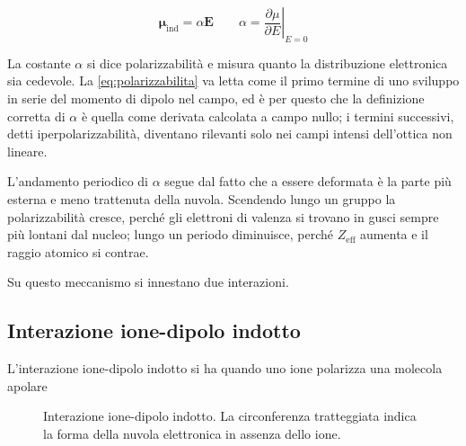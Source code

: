 \begin{equation}
    \boldsymbol{\mu}_{\text{ind}} = \alpha\mathbf{E} \qquad \alpha = \left.\frac{\partial\mu}{\partial E}\right|_{E=0}
    \label{eq:polarizzabilita}
\end{equation}

La costante $\alpha$ si dice polarizzabilità e misura quanto la distribuzione elettronica sia cedevole.
La \eqref{eq:polarizzabilita} va letta come il primo termine di uno sviluppo in serie del momento di dipolo nel campo, ed è per questo che la definizione corretta di $\alpha$ è quella come derivata calcolata a campo nullo; i termini successivi, detti iperpolarizzabilità, diventano rilevanti solo nei campi intensi dell'ottica non lineare.

L'andamento periodico di $\alpha$ segue dal fatto che a essere deformata è la parte più esterna e meno trattenuta della nuvola.
Scendendo lungo un gruppo la polarizzabilità cresce, perché gli elettroni di valenza si trovano in gusci sempre più lontani dal nucleo; lungo un periodo diminuisce, perché $Z_{\text{eff}}$ aumenta e il raggio atomico si contrae.

\newpage

Su questo meccanismo si innestano due interazioni.

\subsection{Interazione ione-dipolo indotto}

L'interazione ione-dipolo indotto si ha quando uno ione polarizza una molecola apolare

\begin{figure}[htbp]
    \centering
    \caption{Interazione ione-dipolo indotto.
    La circonferenza tratteggiata indica la forma della nuvola elettronica in assenza dello ione.}
    \label{fig:ione-dipolo-indotto}
\end{figure}

